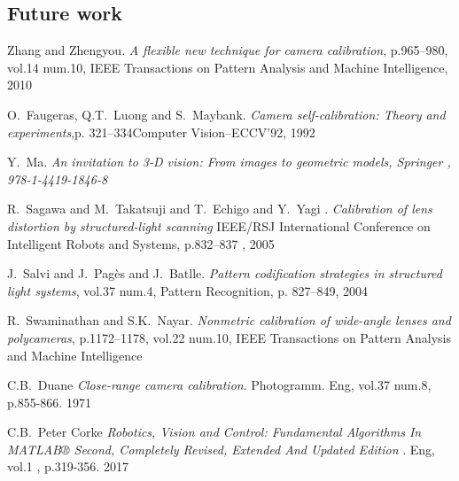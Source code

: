 \documentclass[journal,final,a4paper,twoside]{PS}
\begin{document}
\subsection{Future work}
\label{sec:future}



%

\begin{thebibliography}{1}
Zhang and Zhengyou. \emph{A flexible new technique for camera calibration}, p.965--980, vol.14 num.10, IEEE Transactions on Pattern Analysis and Machine Intelligence, 2010


O.~Faugeras, Q.T.~Luong and S.~Maybank. \emph{Camera self-calibration: Theory and experiments},p. 321--334Computer Vision--ECCV'92, 1992

Y.~Ma. \emph{{An invitation to 3-D vision: From images to geometric models}, {Springer} , {978-1-4419-1846-8}}

R.~Sagawa and M.~Takatsuji and T.~Echigo and Y.~Yagi . \emph{Calibration of lens distortion by structured-light scanning} IEEE/RSJ International Conference on Intelligent Robots and Systems, p.832--837 , 2005

J.~Salvi and J.~Pag{\`e}s and J.~Batlle. \emph{Pattern codification strategies in structured light systems}, vol.37 num.4, Pattern Recognition, p. 827--849, 2004

R.~Swaminathan and S.K.~Nayar. \emph{Nonmetric calibration of wide-angle lenses and polycameras}, p.1172--1178, vol.22 num.10, IEEE Transactions on Pattern Analysis and Machine Intelligence


C.B.~Duane  \emph{Close-range camera calibration}. Photogramm. Eng, vol.37 num.8, p.855-866. 1971

C.B.~Peter Corke  \emph{Robotics, Vision and Control: Fundamental Algorithms In MATLAB® Second, Completely Revised, Extended And Updated Edition }. Eng, vol.1 , p.319-356. 2017


\end{thebibliography}
\end{document}
